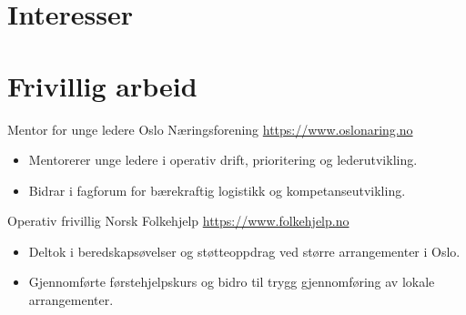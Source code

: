 \documentclass[a4paper, serif, 10pt]{moderncv}
\begin{document}
\section{Interesser}

\section{Frivillig arbeid}

        {Mentor for unge ledere}
        {Oslo Næringsforening}
        {\url{https://www.oslonaring.no}}
        {}
        {\begin{itemize}
\item Mentorerer unge ledere i operativ drift, prioritering og lederutvikling.
\item Bidrar i fagforum for bærekraftig logistikk og kompetanseutvikling.
\end{itemize}}
    

        {Operativ frivillig}
        {Norsk Folkehjelp}
        {\url{https://www.folkehjelp.no}}
        {}
        {\begin{itemize}
\item Deltok i beredskapsøvelser og støtteoppdrag ved større arrangementer i Oslo.
\item Gjennomførte førstehjelpskurs og bidro til trygg gjennomføring av lokale arrangementer.
\end{itemize}}
    
\end{document}
